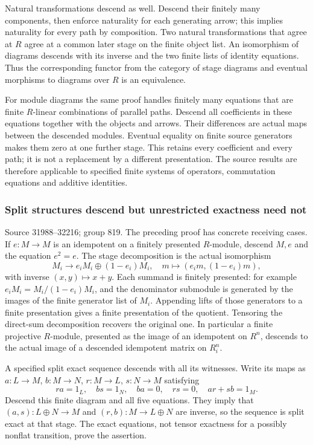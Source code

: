 Natural transformations descend as well. Descend their finitely many components, then enforce naturality for each generating arrow; this implies naturality for every path by composition. Two natural transformations that agree at \(R\) agree at a common later stage on the finite object list. An isomorphism of diagrams descends with its inverse and the two finite lists of identity equations. Thus the corresponding functor from the category of stage diagrams and eventual morphisms to diagrams over \(R\) is an equivalence.

For module diagrams the same proof handles finitely many equations that are finite \(R\)-linear combinations of parallel paths. Descend all coefficients in these equations together with the objects and arrows. Their differences are actual maps between the descended modules. Eventual equality on finite source generators makes them zero at one further stage. This retains every coefficient and every path; it is not a replacement by a different presentation. The source results are therefore applicable to specified finite systems of operators, commutation equations and additive identities.

\subsubsection{Split structures descend but unrestricted exactness need not}\label{split-structures-descend-but-unrestricted-exactness-need-not}

Source 31988--32216; group 819. The preceding proof has concrete receiving cases. If \(e:M\to M\) is an idempotent on a finitely presented \(R\)-module, descend \(M,e\) and the equation \(e^2=e\). The stage decomposition is the actual isomorphism \[
M_i\longrightarrow e_iM_i\oplus(1-e_i)M_i,\quad
m\longmapsto(e_i m,(1-e_i)m),
\] with inverse \((x,y)\mapsto x+y\). Each summand is finitely presented: for example \(e_iM_i=M_i/(1-e_i)M_i\), and the denominator submodule is generated by the images of the finite generator list of \(M_i\). Appending lifts of those generators to a finite presentation gives a finite presentation of the quotient. Tensoring the direct-sum decomposition recovers the original one. In particular a finite projective \(R\)-module, presented as the image of an idempotent on \(R^n\), descends to the actual image of a descended idempotent matrix on \(R_i^n\).

A specified split exact sequence descends with all its witnesses. Write its maps as \(a:L\to M\), \(b:M\to N\), \(r:M\to L\), \(s:N\to M\) satisfying \[
ra=1_L,\quad bs=1_N,\quad ba=0,\quad rs=0,\quad ar+sb=1_M.
\] Descend this finite diagram and all five equations. They imply that \((a,s):L\oplus N\to M\) and \((r,b):M\to L\oplus N\) are inverse, so the sequence is split exact at that stage. The exact equations, not tensor exactness for a possibly nonflat transition, prove the assertion.

